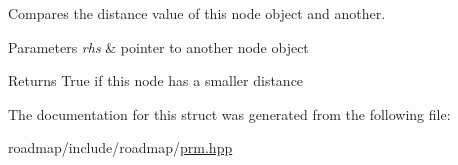 Compares the distance value of this node object and another. 


\begin{DoxyParams}{Parameters}
{\em rhs} & pointer to another node object \\
\hline
\end{DoxyParams}
\begin{DoxyReturn}{Returns}
True if this node has a smaller distance 
\end{DoxyReturn}


The documentation for this struct was generated from the following file\+:\begin{DoxyCompactItemize}
\item 
roadmap/include/roadmap/\hyperlink{prm_8hpp}{prm.\+hpp}\end{DoxyCompactItemize}
